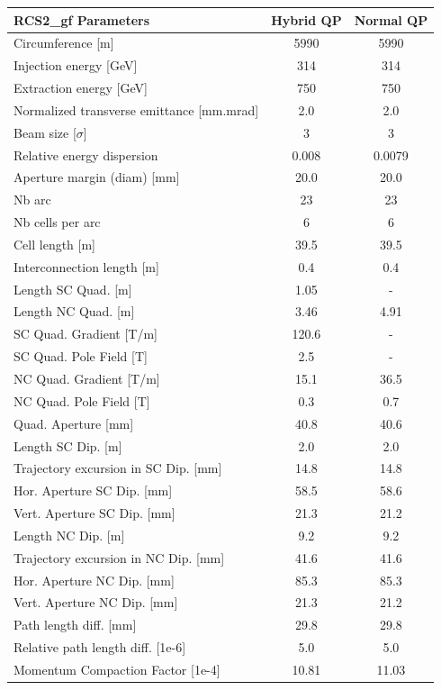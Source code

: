 \begin{tabular}{lcc}
\toprule
RCS2_gf Parameters & Hybrid QP & Normal QP \\
\midrule
Circumference [m] & 5990 & 5990 \\
Injection energy [GeV] & 314 & 314 \\
Extraction energy [GeV] & 750 & 750 \\
Normalized transverse emittance [mm.mrad] & 2.0 & 2.0 \\
Beam size [$\sigma$] & 3 & 3 \\
Relative energy dispersion & 0.008 & 0.0079 \\
Aperture margin (diam) [mm] & 20.0 & 20.0 \\
Nb arc & 23 & 23 \\
Nb cells per arc & 6 & 6 \\
Cell length [m] & 39.5 & 39.5 \\
Interconnection length [m] & 0.4 & 0.4 \\
Length SC Quad. [m] & 1.05 & - \\
Length NC Quad. [m] & 3.46 & 4.91 \\
SC Quad. Gradient [T/m] & 120.6 & - \\
SC Quad. Pole Field [T] & 2.5 & - \\
NC Quad. Gradient [T/m] & 15.1 & 36.5 \\
NC Quad. Pole Field [T] & 0.3 & 0.7 \\
Quad. Aperture [mm] & 40.8 & 40.6 \\
Length SC Dip. [m] & 2.0 & 2.0 \\
Trajectory excursion in SC Dip. [mm] & 14.8 & 14.8 \\
Hor. Aperture SC Dip. [mm] & 58.5 & 58.6 \\
Vert. Aperture SC Dip. [mm] & 21.3 & 21.2 \\
Length NC Dip. [m] & 9.2 & 9.2 \\
Trajectory excursion in NC Dip. [mm] & 41.6 & 41.6 \\
Hor. Aperture NC Dip. [mm] & 85.3 & 85.3 \\
Vert. Aperture NC Dip. [mm] & 21.3 & 21.2 \\
Path length diff. [mm] & 29.8 & 29.8 \\
Relative path length diff. [1e-6] & 5.0 & 5.0 \\
Momentum Compaction Factor [1e-4] & 10.81 & 11.03 \\
\bottomrule
\end{tabular}
